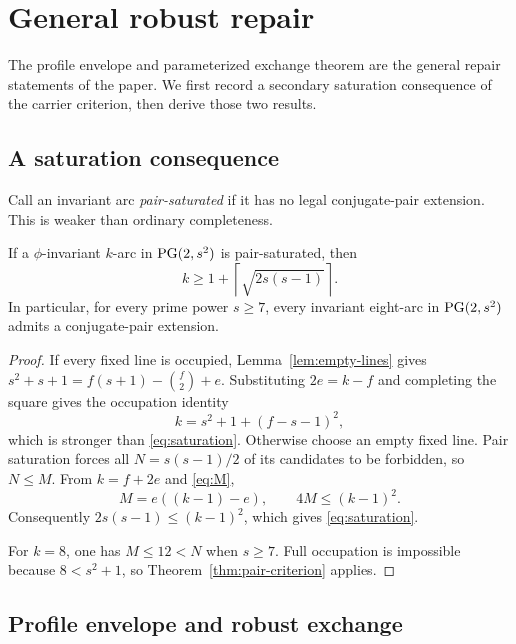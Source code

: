 \section{General robust repair}

The profile envelope and parameterized exchange theorem are the general
repair statements of the paper.  We first record a secondary saturation
consequence of the carrier criterion, then derive those two results.

\subsection*{A saturation consequence}

Call an invariant arc \emph{pair-saturated} if it has no legal conjugate-pair
extension.  This is weaker than ordinary completeness.

\begin{corollary}\label{cor:saturation}
If a $\phi$-invariant $k$-arc in $\operatorname{PG}(2,s^2)$ is pair-saturated, then
\begin{equation}\label{eq:saturation}
  k\ge 1+\left\lceil\sqrt{2s(s-1)}\right\rceil.
\end{equation}
In particular, for every prime power $s\ge7$, every invariant eight-arc in
$\operatorname{PG}(2,s^2)$ admits a conjugate-pair extension.
\end{corollary}

\begin{proof}
If every fixed line is occupied, Lemma~\ref{lem:empty-lines} gives
$s^2+s+1=f(s+1)-\binom f2+e$.  Substituting $2e=k-f$ and completing the
square gives the occupation identity
\[
  k=s^2+1+(f-s-1)^2,
\]
which is stronger than \eqref{eq:saturation}.  Otherwise choose an empty
fixed line.  Pair saturation forces all $N=s(s-1)/2$ of its candidates to
be forbidden, so $N\le M$.  From $k=f+2e$ and \eqref{eq:M},
\[
  M=e((k-1)-e),
  \qquad
  4M\le(k-1)^2.
\]
Consequently $2s(s-1)\le(k-1)^2$, which gives
\eqref{eq:saturation}.

For $k=8$, one has $M\le12<N$ when $s\ge7$.  Full occupation is impossible
because $8<s^2+1$, so Theorem~\ref{thm:pair-criterion} applies.
\end{proof}

\subsection*{Profile envelope and robust exchange}

